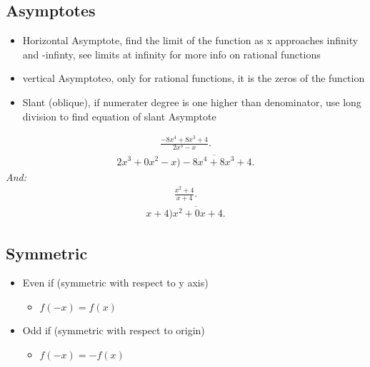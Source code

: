 \documentclass{report}
\begin{document}
    \subsection{Asymptotes}
    \begin{itemize}
      \item Horizontal Asymptote, find the limit of the function as x approaches infinity and -infinty, see limits at infinity for more info on rational functions
      \item vertical Asymptoteo, only for rational functions, it is the zeros of the function
      \item Slant (oblique), if numerater degree is one higher than denominator, use long division to find equation of slant Asymptote
    \end{itemize}
    \begin{align*}
      \frac{-8x^{4}+8x^{3}+4}{2x^{3}-x}
    .\end{align*}
    \begin{align*}
      2x^{3}+0x^{2}-x \overline{)-8x^{4}+8x^{3}+4}
    .\end{align*}
    \bigbreak \noindent 
    \textit{And:}
    \begin{align*}
      \frac{x^{2}+4}{x+4}
    .\end{align*}
    \begin{align*}
      x+4 \overline{)x^{2}+0x+4}
    .\end{align*}


    \bigbreak \noindent \bigbreak \noindent 
    \subsection{Symmetric}
    \begin{itemize}
      \item Even if (symmetric with respect to y axis)
        \begin{itemize}
          \item $f(-x) = f(x) $
        \end{itemize}
      \item Odd if (symmetric with respect to origin)
        \begin{itemize}
          \item $f(-x) = -f(x)$
        \end{itemize}
    \end{itemize}

    \bigbreak \noindent \bigbreak \noindent 
\end{document}
